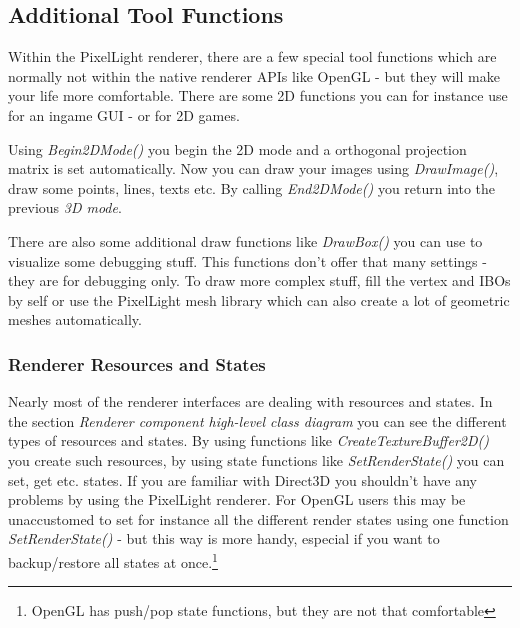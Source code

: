 \subsection{Additional Tool Functions}
Within the PixelLight renderer, there are a few special tool functions which are normally not within the native renderer \ac{API}s like OpenGL - but they will make your life more comfortable. There are some 2D functions you can for instance use for an ingame \ac{GUI} - or for 2D games.

Using \emph{Begin2DMode()} you begin the 2D mode and a orthogonal projection matrix is set automatically. Now you can draw your images using \emph{DrawImage()}, draw some points, lines, texts etc. By calling \emph{End2DMode()} you return into the previous \emph{3D mode}.

There are also some additional draw functions like \emph{DrawBox()} you can use to visualize some debugging stuff. This functions don't offer that many settings - they are for debugging only. To draw more complex stuff, fill the vertex and \ac{IBO}s by self or use the PixelLight mesh library which can also create a lot of geometric meshes automatically.



\subsubsection{Renderer Resources and States}
Nearly most of the renderer interfaces are dealing with resources and states. In the section \emph{Renderer component high-level class diagram} you can see the different types of resources and states. By using functions like \emph{CreateTextureBuffer2D()} you create such resources, by using state functions like \emph{SetRenderState()} you can set, get etc. states. If you are familiar with Direct3D you shouldn't have any problems by using the PixelLight renderer. For OpenGL users this may be unaccustomed to set for instance all the different render states using one function \emph{SetRenderState()} - but this way is more handy, especial if you want to backup/restore all states at once.\footnote{OpenGL has push/pop state functions, but they are not that comfortable}




